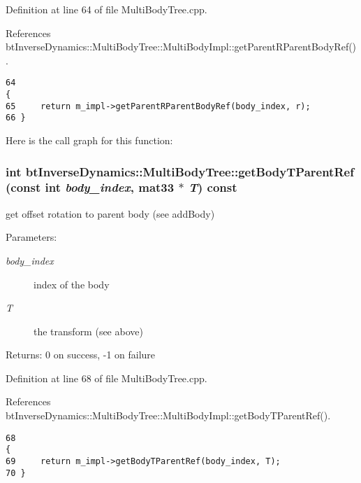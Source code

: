 Definition at line 64 of file MultiBodyTree.cpp.

References btInverseDynamics::MultiBodyTree::MultiBodyImpl::getParentRParentBodyRef().

\begin{Code}\begin{verbatim}64                                                                               {
65     return m_impl->getParentRParentBodyRef(body_index, r);
66 }
\end{verbatim}
\end{Code}




Here is the call graph for this function:\hypertarget{classbt_inverse_dynamics_1_1_multi_body_tree_3781cd90824117bc9f483b4f13b26f1c}{
\subsubsection[getBodyTParentRef]{\setlength{\rightskip}{0pt plus 5cm}int btInverseDynamics::MultiBodyTree::getBodyTParentRef (const int {\em body\_\-index}, \/  mat33 $\ast$ {\em T}) const}}
\label{classbt_inverse_dynamics_1_1_multi_body_tree_3781cd90824117bc9f483b4f13b26f1c}


get offset rotation to parent body (see addBody) \begin{Desc}
\item[Parameters:]
\begin{description}
\item[{\em body\_\-index}]index of the body \item[{\em T}]the transform (see above) \end{description}
\end{Desc}
\begin{Desc}
\item[Returns:]0 on success, -1 on failure \end{Desc}


Definition at line 68 of file MultiBodyTree.cpp.

References btInverseDynamics::MultiBodyTree::MultiBodyImpl::getBodyTParentRef().

\begin{Code}\begin{verbatim}68                                                                          {
69     return m_impl->getBodyTParentRef(body_index, T);
70 }
\end{verbatim}
\end{Code}




